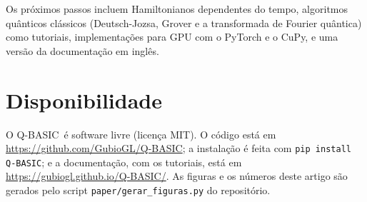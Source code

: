 \documentclass[11pt,a4paper]{article}
\newcommand{\qbasic}{\textsc{Q-BASIC}}
\newcommand{\codigo}[1]{\texttt{#1}}
\begin{document}
Os próximos passos incluem Hamiltonianos dependentes do tempo, algoritmos quânticos
clássicos (Deutsch-Jozsa, Grover e a transformada de Fourier quântica) como tutoriais,
implementações para GPU com o PyTorch e o CuPy, e uma versão da documentação em inglês.

\section*{Disponibilidade}

O \qbasic\ é software livre (licença MIT). O código está em
\url{https://github.com/GubioGL/Q-BASIC}; a instalação é feita com
\codigo{pip install Q-BASIC}; e a documentação, com os tutoriais, está em
\url{https://gubiogl.github.io/Q-BASIC/}. As figuras e os números deste artigo são gerados
pelo script \codigo{paper/gerar\_figuras.py} do repositório.




\end{document}
